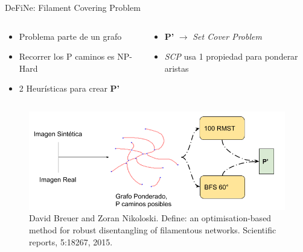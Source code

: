 \documentclass[aspectratio=169]{beamer}
\begin{document}
\begin{frame}{DeFiNe: Filament Covering Problem}
    \begin{columns}
        \begin{column}{0.55\textwidth}
            \begin{itemize}\fontsize{9pt}{5}\selectfont
                \item Problema parte de un grafo
                \item Recorrer los P caminos es NP-Hard
                \item 2 Heur\'isticas para crear {\bf P'}
            \end{itemize}        
        \end{column}
        \begin{column}{0.45\textwidth}
            \begin{itemize}\fontsize{9pt}{7.2}\selectfont
                
                \item {\bf P'} $\rightarrow$ {\it Set Cover Problem}
                \item {\it SCP} usa 1 propiedad para ponderar aristas
            \end{itemize}
        \end{column}
    \end{columns}
    \begin{figure}
        \centering
        \includegraphics[scale=0.42]{Pictures/flujoDefine2.png}
        \caption{David Breuer and Zoran Nikoloski. Define: an optimisation-based method for robust disentangling of filamentous networks. Scientific reports, 5:18267, 2015.}
    \end{figure}
\end{frame}
\end{document}
